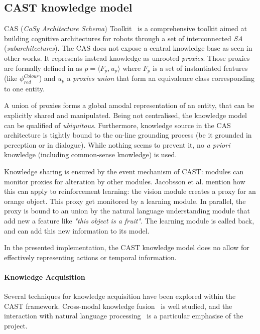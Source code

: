 \documentclass{IEEEtran}
\begin{document}
\subsection{CAST knowledge model}
\label{sect|cast}

CAS (\emph{CoSy Architecture Schema}) Toolkit~\cite{Hawes2007} is a
comprehensive toolkit aimed at building cognitive architectures for robots
through a set of interconnected \emph{SA} (\emph{subarchitectures}). The CAS
does not expose a central knowledge base as seen in other works. It represents
instead knowledge as unrooted \emph{proxies}. Those proxies are formally
defined in \cite{jacobsson2008crossmodal} as $p= \langle F_p, u_p \rangle$ where $F_p$ is
a set of instantiated features (like $\phi^{Colour}_{red}$) and $u_p$ a
\emph{proxies union} that form an equivalence class corresponding to one
entity.

A union of proxies forms a global amodal representation of an entity, that can
be explicitly shared and manipulated. Being not centralised, the knowledge
model can be qualified of \emph{ubiquitous}. Furthermore, knowledge source in
the CAS architecture is tightly bound to the on-line grounding process (be it
grounded in perception or in dialogue). While nothing seems to prevent it, no
{\it a priori} knowledge (including common-sense knowledge) is used.

Knowledge sharing is ensured by the event mechanism of CAST: modules can
monitor proxies for alteration by other modules. Jacobsson et al. mention how
this can apply to reinforcement learning: the vision module creates a proxy for
an orange object. This proxy get monitored by a learning module. In parallel,
the proxy is bound to an union by the natural language understanding module
that add new a feature like \emph{"this object is a fruit"}. The learning
module is called back, and can add this new information to its model.

In the presented implementation, the CAST knowledge model does no allow for
effectively representing actions or temporal information.

\paragraph{Knowledge Acquisition} Several techniques for knowledge acquisition
have been explored within the CAST framework. Cross-modal knowledge
fusion~\cite{Hawes2007a} is well studied, and the interaction with natural
language processing~\cite{Kruijff2010, Kruijff2010a} is a particular emphasise
of the project.
\end{document}
